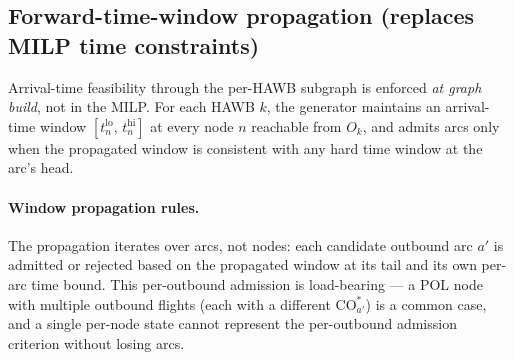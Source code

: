 \documentclass[11pt,a4paper]{article}
\theoremstyle{definition}
\begin{document}
\subsection{Forward-time-window propagation (replaces MILP time constraints)}
\label{sec:fwd-time-propagation}

Arrival-time feasibility through the per-HAWB subgraph is enforced
\emph{at graph build}, not in the MILP. For each HAWB $k$, the generator
maintains an arrival-time window $[t^{\text{lo}}_n,\, t^{\text{hi}}_n]$ at
every node $n$ reachable from $O_k$, and admits arcs only when the
propagated window is consistent with any hard time window at the arc's head.

\paragraph{Window propagation rules.}
The propagation iterates over arcs, not nodes: each candidate outbound arc
$a'$ is admitted or rejected based on the propagated window at its tail and
its own per-arc time bound. This per-outbound admission is load-bearing ---
a POL node with multiple outbound flights (each with a different
$\text{CO}_{a'}^*$) is a common case, and a single per-node state cannot
represent the per-outbound admission criterion without losing arcs.
\end{document}

